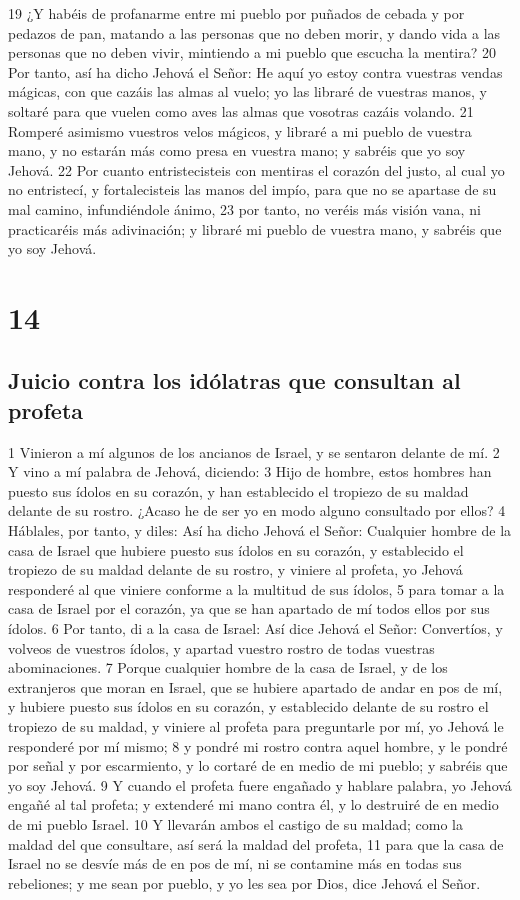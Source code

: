 19 ¿Y habéis de profanarme entre mi pueblo por puñados de cebada y por pedazos de pan, matando a las personas que no deben morir, y dando vida a las personas que no deben vivir, mintiendo a mi pueblo que escucha la mentira?
20 Por tanto, así ha dicho Jehová el Señor: He aquí yo estoy contra vuestras vendas mágicas, con que cazáis las almas al vuelo; yo las libraré de vuestras manos, y soltaré para que vuelen como aves las almas que vosotras cazáis volando.
21 Romperé asimismo vuestros velos mágicos, y libraré a mi pueblo de vuestra mano, y no estarán más como presa en vuestra mano; y sabréis que yo soy Jehová.
22 Por cuanto entristecisteis con mentiras el corazón del justo, al cual yo no entristecí, y fortalecisteis las manos del impío, para que no se apartase de su mal camino, infundiéndole ánimo,
23 por tanto, no veréis más visión vana, ni practicaréis más adivinación; y libraré mi pueblo de vuestra mano, y sabréis que yo soy Jehová.

\chapter{14}

\section*{Juicio contra los idólatras que consultan al profeta}

1 Vinieron a mí algunos de los ancianos de Israel, y se sentaron delante de mí.
2 Y vino a mí palabra de Jehová, diciendo:
3 Hijo de hombre, estos hombres han puesto sus ídolos en su corazón, y han establecido el tropiezo de su maldad delante de su rostro. ¿Acaso he de ser yo en modo alguno consultado por ellos?
4 Háblales, por tanto, y diles: Así ha dicho Jehová el Señor: Cualquier hombre de la casa de Israel que hubiere puesto sus ídolos en su corazón, y establecido el tropiezo de su maldad delante de su rostro, y viniere al profeta, yo Jehová responderé al que viniere conforme a la multitud de sus ídolos,
5 para tomar a la casa de Israel por el corazón, ya que se han apartado de mí todos ellos por sus ídolos.
6 Por tanto, di a la casa de Israel: Así dice Jehová el Señor: Convertíos, y volveos de vuestros ídolos, y apartad vuestro rostro de todas vuestras abominaciones.
7 Porque cualquier hombre de la casa de Israel, y de los extranjeros que moran en Israel, que se hubiere apartado de andar en pos de mí, y hubiere puesto sus ídolos en su corazón, y establecido delante de su rostro el tropiezo de su maldad, y viniere al profeta para preguntarle por mí, yo Jehová le responderé por mí mismo;
8 y pondré mi rostro contra aquel hombre, y le pondré por señal y por escarmiento, y lo cortaré de en medio de mi pueblo; y sabréis que yo soy Jehová.
9 Y cuando el profeta fuere engañado y hablare palabra, yo Jehová engañé al tal profeta; y extenderé mi mano contra él, y lo destruiré de en medio de mi pueblo Israel.
10 Y llevarán ambos el castigo de su maldad; como la maldad del que consultare, así será la maldad del profeta,
11 para que la casa de Israel no se desvíe más de en pos de mí, ni se contamine más en todas sus rebeliones; y me sean por pueblo, y yo les sea por Dios, dice Jehová el Señor.

